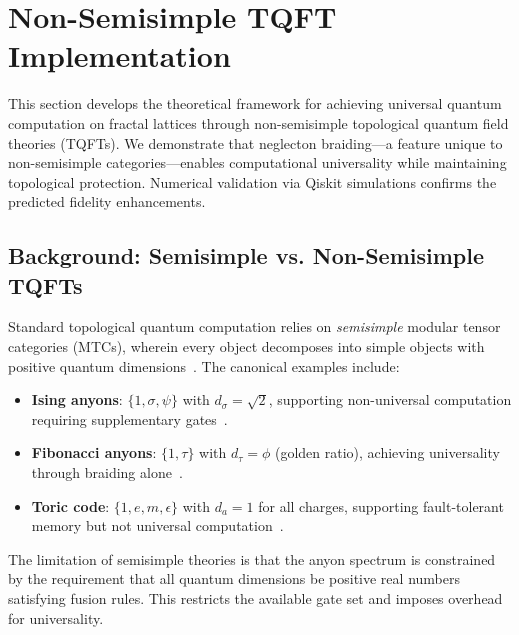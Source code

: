 
\section{Non-Semisimple TQFT Implementation}
\label{sec:tqft}

This section develops the theoretical framework for achieving universal
quantum computation on fractal lattices through non-semisimple topological
quantum field theories (TQFTs). We demonstrate that neglecton braiding—a
feature unique to non-semisimple categories—enables computational  universality while maintaining topological protection. Numerical validation
via Qiskit simulations confirms the predicted fidelity enhancements.

\subsection{Background: Semisimple vs. Non-Semisimple TQFTs}

Standard topological quantum computation relies on \emph{semisimple} modular
tensor categories (MTCs), wherein every object decomposes into simple
objects with positive quantum dimensions~\cite{Kitaev2006,Nayak2008}. The
canonical examples include:

\begin{itemize}
\item \textbf{Ising anyons}: $\{1, \sigma, \psi\}$ with $d_\sigma = \sqrt{2}$,
supporting non-universal computation requiring supplementary
gates~\cite{Nayak2008}.
\item \textbf{Fibonacci anyons}: $\{1, \tau\}$ with $d_\tau = \phi$ (golden
ratio), achieving universality through braiding alone~\cite{Freedman2002}.
\item \textbf{Toric code}: $\{1, e, m, \epsilon\}$ with $d_a = 1$ for all
charges, supporting fault-tolerant memory but not universal
computation~\cite{Kitaev2003}.
\end{itemize}

The limitation of semisimple theories is that the anyon spectrum is
constrained by the requirement that all quantum dimensions be positive
real numbers satisfying fusion rules. This restricts the available gate
set and imposes overhead for universality.

